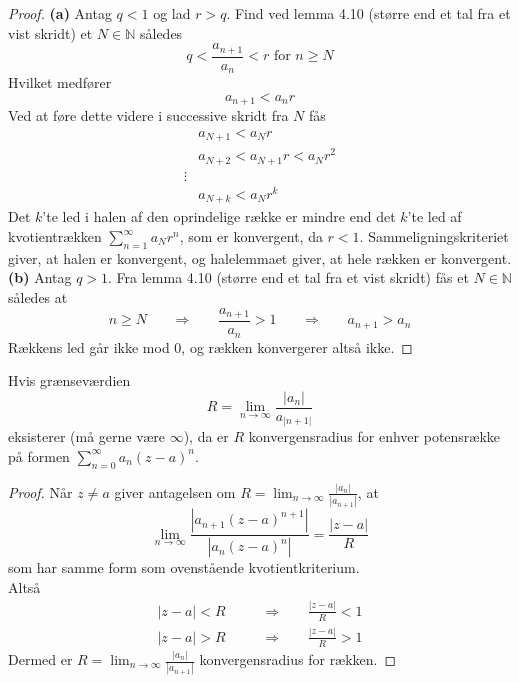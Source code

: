 \begin{proof}
\textbf{(a)} Antag $q < 1$ og lad $r>q$. Find ved lemma 4.10 (større end et tal fra et vist skridt) et $N\in\mathbb{N}$ således
\begin{equation}
q < \frac{a_{n+1}}{a_n} < r\text{ for } n \geq N
\end{equation}
Hvilket medfører
\begin{equation}
a_{n+1}<a_nr
\end{equation}
Ved at føre dette videre i successive skridt fra $N$ fås
\begin{align}
&a_{N+1}<a_Nr\\
&a_{N+2}<a_{N+1}r<a_Nr^2\\
\vdots\\
&a_{N+k}<a_Nr^k
\end{align}
Det $k$'te led i halen af den oprindelige række er mindre end det $k$'te led af kvotientrækken $\sum_{n=1}^\infty a_Nr^n$, som er konvergent, da $r<1$. Sammeligningskriteriet giver, at halen er konvergent, og halelemmaet giver, at hele rækken er konvergent.
\textbf{(b)} Antag $q>1$. Fra lemma 4.10 (større end et tal fra et vist skridt) fås et $N\in\mathbb{N}$ således at
\begin{equation}
n\geq N \phantom{mm} \Rightarrow \phantom{mm} \frac{a_{n+1}}{a_n}>1\phantom{mm} \Rightarrow \phantom{mm} a_{n+1}>a_n
\end{equation}
Rækkens led går ikke mod 0, og rækken konvergerer altså ikke.
\end{proof}
\begin{theorem}[Konvergensradius] Hvis grænseværdien 
\begin{equation}
R=\lim_{n\to\infty}\frac{|a_n|}{a_{|n+1|}}
\end{equation}
eksisterer (må gerne være $\infty$), da er $R$ konvergensradius for enhver potensrække på formen $\sum_{n=0}^\infty a_n(z-a)^n$.
\end{theorem}
\begin{proof}
Når $z\neq a$ giver antagelsen om $R=\lim_{n\to\infty}\frac{|a_n|}{|a_{n+1}|}$, at 
\begin{equation}
\lim_{n\to\infty}\frac{|a_{n+1}(z-a)^{n+1}|}{|a_n(z-a)^n|}=\frac{|z-a|}{R}
\end{equation}
som har samme form som ovenstående kvotientkriterium.\\
Altså
\begin{align}
|z-a|<R \phantom{mm} &\Rightarrow \phantom{mm} \frac{|z-a|}{R}<1\\
|z-a|>R \phantom{mm} &\Rightarrow \phantom{mm} \frac{|z-a|}{R}>1
\end{align}
Dermed er $R=\lim_{n\to\infty}\frac{|a_n|}{|a_{n+1}|}$ konvergensradius for rækken.
\end{proof}
\clearpage
